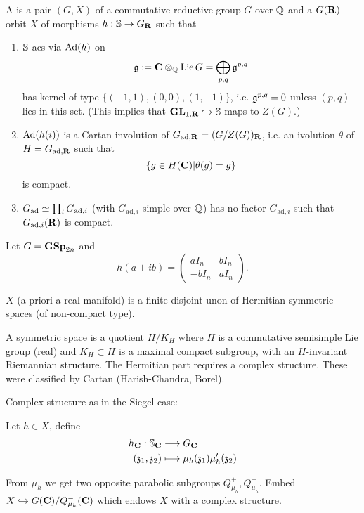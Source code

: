 \begin{definition}
A  is a pair $(G,X)$ of a commutative reductive group $G$ over $\Q$
and a $G(\R)$-orbit $X$ of morphisms $h:\S\to G_{\R}$ such that
\begin{enumerate}[1)]
\item $\S$ acs via $\Ad(h)$ on
	\[
		\kg \defeq \C\otimes_\Q \Lie G = \bigoplus_{p,q}\kg^{p,q}
	\]
	has kernel of type $\{(-1,1), (0,0), (1,-1)\} $, i.e. $\kg^{p,q}=0$ unless $(p,q)$ lies
	in this set. (This implies that $\GL_{1,\R}\injto \S$ maps to $Z(G)$.)
\item $\Ad(h(i))$ is a Cartan involution of $G_{\text{ad},\R} = (G /Z(G))_{\R}$, i.e. an
	ivolution $\theta$ of $H = G_{\text{ad},\R}$ such that
	\[
		\{g\in H(\C) | \theta(g)=g\}
	\]
	is compact.
\item $G_{\text{ad}}\isoto\prod_i G_{\text{ad},i}$ (with $G_{\text{ad},i}$ simple over
	$\Q$) has no factor $G_{\text{ad},i}$ such that $G_{\text{ad},i}(\R)$ is compact.
\end{enumerate}
\end{definition}
\begin{example}
Let $G=\GSp_{2n}$ and
\[
h(a+ib) =
\begin{pmatrix} aI_n & bI_n \\ -bI_n & aI_n
\end{pmatrix} .
\]
\end{example}
\begin{proposition}
$X$ (a priori a real manifold) is a finite disjoint unon of Hermitian symmetric spaces
(of non-compact type).
\end{proposition}
A symmetric space is a quotient $H /K_H$ where $H$ is a commutative semisimple Lie group
(real) and $K_H\subset H$ is a maximal compact subgroup, with an $H$-invariant Riemannian
structure. The Hermitian part requires a complex structure. These were classified by
Cartan (Harish-Chandra, Borel).

Complex structure as in the Siegel case:
\begin{definition}
Let $h\in X$, define
\begin{align*}
h_{\C}: \S_{\C} &\longrightarrow G_{\C} \\
(\kz_1,\kz_2) &\longmapsto \mu_h(\kz_1)\mu_h'(\kz_2)
\end{align*}
\end{definition}
From $\mu_h$ we get two opposite parabolic subgroups $Q_{\mu_h}^{+},Q_{\mu_h}^{-}$. Embed
$X\injto G(\C) / Q_{\mu_h}^{-}(\C)$ which endows $X$ with a complex structure.

